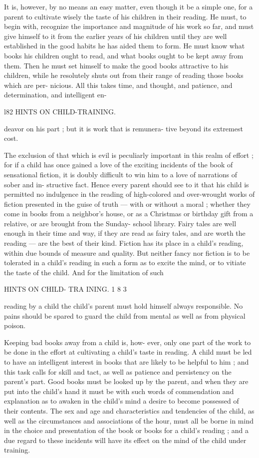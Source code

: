 \documentclass[
]{book}
\begin{document}
It is, however, by no means an easy matter, even though it be a simple one, for a parent to cultivate wisely the taste of his children in their reading. He must, to begin with, recognize the importance and magnitude of his work so far, and must give himself to it from the earlier years of his children until they are well established in the good habits he has aided them to form. He must know what books his children ought to read, and what books ought to be kept away from them. Then he must set himself to make the good books attractive to his children, while he resolutely shuts out from their range of reading those books which are per- nicious. All this takes time, and thought, and patience, and determination, and intelligent en-

l82 HINTS ON CHILD-TRAINING.

deavor on his part ; but it is work that is remunera- tive beyond its extremest cost.

The exclusion of that which is evil is peculiarly important in this realm of effort ; for if a child has once gained a love of the exciting incidents of the book of sensational fiction, it is doubly difficult to win him to a love of narrations of sober and in- structive fact. Hence every parent should see to it that his child is permitted no indulgence in the reading of high-colored and over-wrought works of fiction presented in the guise of truth --- with or without a moral ; whether they come in books from a neighbor's house, or as a Christmas or birthday gift from a relative, or are brought from the Sunday- school library. Fairy tales are well enough in their time and way, if they are read as fairy tales, and are worth the reading --- are the best of their kind. Fiction has its place in a child's reading, within due bounds of measure and quality. But neither fancy nor fiction is to be tolerated in a child's reading in such a form as to excite the mind, or to vitiate the taste of the child. And for the limitation of such

HINTS ON CHILD- TRA INING. 1 8 3

reading by a child the child's parent must hold himself always responsible. No pains should be spared to guard the child from mental as well as from physical poison.

Keeping bad books away from a child is, how- ever, only one part of the work to be done in the effort at cultivating a child's taste in reading. A child must be led to have an intelligent interest in books that are likely to be helpful to him ; and this task calls for skill and tact, as well as patience and persistency on the parent's part. Good books must be looked up by the parent, and when they are put into the child's hand it must be with such words of commendation and explanation as to awaken in the child's mind a desire to become possessed of their contents. The sex and age and characteristics and tendencies of the child, as well as the circumstances and associations of the hour, must all be borne in mind in the choice and presentation of the book or books for a child's reading ; and a due regard to these incidents will have its effect on the mind of the child under training.
\end{document}
